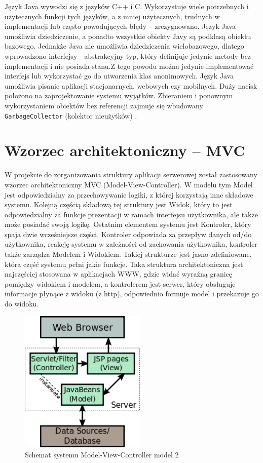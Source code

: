 \documentclass[eng,printmode,oneside]{mgr}
\begin{document}
Język Java wywodzi się z języków C++ i C. Wykorzystuje wiele potrzebnych i
użytecznych funkcji tych języków, a z mniej użytecznych, trudnych w
implementacji lub często powodujących błędy -- zrezygnowano. Język Java
umożliwia dziedziczenie, a ponadto wszystkie obiekty Javy są podklasą obiektu
bazowego. Jednakże Java nie umożliwia dziedziczenia wielobazowego, dlatego wprowadzono interfejsy -
abstrakcyjny typ, który definijuje jedynie metody bez implementacji i nie
posiada stanu.Z tego powodu można jedynie implementować
interfejs lub wykorzystać go do utworzenia klas anonimowych. Język Java
umożliwia pisanie aplikacji stacjonarnych, webowych czy mobilnych. Duży nacisk
położono na zaprojektowanie systemu wyjątków. Zbieraniem i ponownym
wykorzystaniem obiektów bez referencji zajmuje się wbudowany
\texttt{GarbageCollector} (kolektor nieużytków) \cite{java.doc}.

\section{Wzorzec architektoniczny -- MVC}

W projekcie do zorganizowania struktury aplikacji serwerowej został zastosowany
wzorzec architektoniczny MVC (Model-View-Controller). W modelu tym Model jest
odpowiedzialny za przechowywanie logiki, z której korzystają inne składowe
systemu. Kolejną częścią składową tej struktury jest Widok, który to jest
odpowiedzialny za funkcje prezentacji w ramach interfejsu użytkownika, ale
także może posiadać swoją logikę. Ostatnim elementem systemu jest Kontroler,
który spaja dwie wcześniejsze części. Kontroler odpowiada za przepływ danych
od/do użytkownika, reakcję systemu w zależności od zachowania użytkownika,
kontroler także zarządza Modelem i Widokiem. Takiej strukturze jest jasno
zdefiniowane, która część systemu pełni jakie funkcje. Taka struktura
architektoniczna jest najczęściej stosowana w aplikacjach WWW, gdzie widać
wyraźną granicę pomiędzy widokiem i modelem, a kontrolerem jest serwer, który
obsługuje informacje płynące z widoku (z http), odpowiednio formuje model i
przekazuje go do widoku. \cite{java.mvc}

\begin{figure}[ht!]
\centering
\includegraphics[width=60mm]{jspModel.png}
\caption{Schemat systemu Model-View-Controller model 2\cite{java.mvc.grafika}}
\label{fig:MVC2}
\end{figure}
\end{document}
